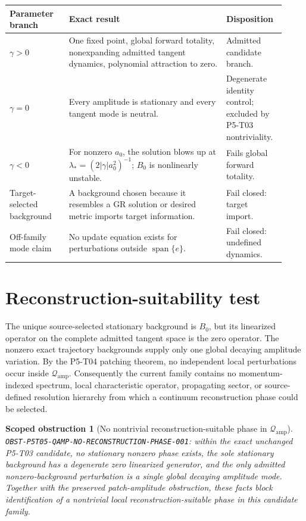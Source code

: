 \documentclass[11pt]{article}
\newcommand{\Qamp}{\mathcal Q_{\mathrm{amp}}}
\newtheorem{obstruction}{Scoped obstruction}
\begin{document}
\begin{longtable}{p{0.20\linewidth}p{0.53\linewidth}p{0.19\linewidth}}
\toprule
Parameter branch & Exact result & Disposition\\
\midrule
\endhead
\(\gamma>0\) &
One fixed point, global forward totality, nonexpanding admitted tangent
dynamics, polynomial attraction to zero. &
Admitted candidate branch.\\
\(\gamma=0\) &
Every amplitude is stationary and every tangent mode is neutral. &
Degenerate identity control; excluded by P5-T03 nontriviality.\\
\(\gamma<0\) &
For nonzero \(a_0\), the solution blows up at
\(\lambda_\ast=(2|\gamma|a_0^2)^{-1}\); \(B_0\) is nonlinearly unstable. &
Fails global forward totality.\\
Target-selected background &
A background chosen because it resembles a GR solution or desired metric
imports target information. &
Fail closed: target import.\\
Off-family mode claim &
No update equation exists for perturbations outside
\(\operatorname{span}\{e\}\). &
Fail closed: undefined dynamics.\\
\bottomrule
\end{longtable}

\section{Reconstruction-suitability test}

The unique source-selected stationary background is \(B_0\), but its
linearized operator on the complete admitted tangent space is the zero
operator.  The nonzero exact trajectory backgrounds supply only one global
decaying amplitude variation.  By the P5-T04 patching theorem, no independent
local perturbations occur inside \(\Qamp\).  Consequently the current family
contains no momentum-indexed spectrum, local characteristic operator,
propagating sector, or source-defined resolution hierarchy from which a
continuum reconstruction phase could be selected.

\begin{obstruction}[No nontrivial reconstruction-suitable phase in
\(\Qamp\)]
\label{obs:reconstruction-phase}
\texttt{OBST-P5T05-QAMP-NO-RECONSTRUCTION-PHASE-001}: within the exact
unchanged P5-T03 candidate, no stationary nonzero phase exists, the sole
stationary background has a degenerate zero linearized generator, and the
only admitted nonzero-background perturbation is a single global decaying
amplitude mode.  Together with the preserved patch-amplitude obstruction,
these facts block identification of a nontrivial local
reconstruction-suitable phase in this candidate family.
\end{obstruction}
\end{document}
